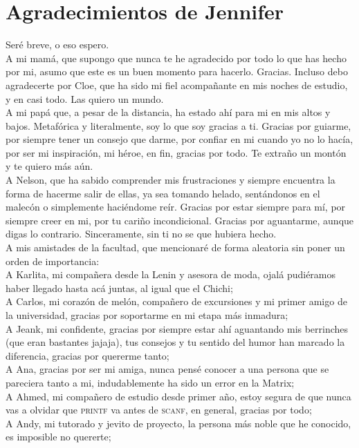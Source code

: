 \section*{Agradecimientos de Jennifer}
Seré breve, o eso espero. \\
A mi mamá, que supongo que nunca te he agradecido por todo lo que has hecho por mi, asumo que este es un buen momento para hacerlo. Gracias. Incluso debo agradecerte por Cloe, que ha sido mi fiel acompañante en mis noches de estudio, y en casi todo. Las quiero un mundo.\\
A mi papá que, a pesar de la distancia, ha estado ahí para mi en mis altos y bajos. Metafórica y literalmente, soy lo que soy gracias a ti. Gracias por guiarme, por siempre tener un consejo que darme, por confiar en mi cuando yo no lo hacía, por ser mi inspiración, mi héroe, en fin, gracias por todo. Te extraño un montón y te quiero más aún. \\
A Nelson, que ha sabido comprender mis frustraciones y siempre encuentra la forma de hacerme salir de ellas, ya sea tomando helado, sentándonos en el malecón o simplemente haciéndome reír. Gracias por estar siempre para mí, por siempre creer en mi, por tu cariño incondicional. Gracias por aguantarme, aunque digas lo contrario. Sinceramente, sin ti no se que hubiera hecho.\\
A mis amistades de la facultad, que mencionaré de forma aleatoria sin poner un orden de importancia: \\
A Karlita, mi compañera desde la Lenin y asesora de moda, ojalá pudiéramos haber llegado hasta acá juntas, al igual que el Chichi; \\
A Carlos, mi corazón de melón, compañero de excursiones y mi primer amigo de la universidad, gracias por soportarme en mi etapa más inmadura; \\
A Jeank, mi confidente, gracias por siempre estar ahí aguantando mis berrinches (que eran bastantes jajaja), tus consejos y tu sentido del humor han marcado la diferencia, gracias por quererme tanto; \\
A Ana, gracias por ser mi amiga, nunca pensé conocer a una persona que se pareciera tanto a mi, indudablemente ha sido un error en la Matrix;\\
A Ahmed, mi compañero de estudio desde primer año, estoy segura de que nunca vas a olvidar que \textsc{printf} va antes de \textsc{scanf}, en general, gracias por todo; \\
A Andy, mi tutorado y jevito de proyecto, la persona más noble que he conocido, es imposible no quererte; \\
